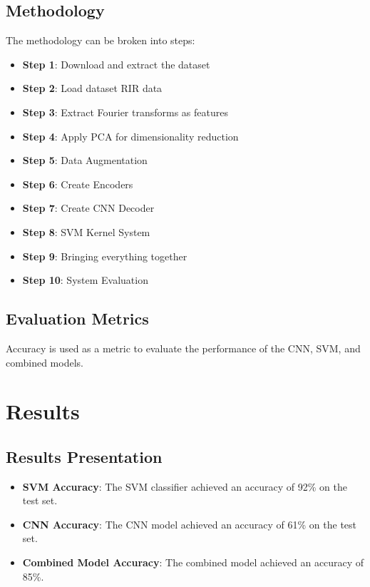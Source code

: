 \documentclass{article}
\begin{document}
\subsection{Methodology}
The methodology can be broken into steps:
\begin{itemize}
\item \textbf{Step 1}: Download and extract the dataset
\item \textbf{Step 2}: Load dataset RIR data
\item \textbf{Step 3}: Extract Fourier transforms as features
\item \textbf{Step 4}: Apply PCA for dimensionality reduction
\item \textbf{Step 5}: Data Augmentation
\item \textbf{Step 6}: Create Encoders
\item \textbf{Step 7}: Create CNN Decoder
\item \textbf{Step 8}: SVM Kernel System
\item \textbf{Step 9}: Bringing everything together
\item \textbf{Step 10}: System Evaluation
\end{itemize}

\subsection{Evaluation Metrics}
Accuracy is used as a metric to evaluate the performance of the CNN, SVM, and combined models.

\section{Results}
\subsection{Results Presentation}
\begin{itemize}
  \item \textbf{SVM Accuracy}: The SVM classifier achieved an accuracy of 92\% on the test set.
  \item \textbf{CNN Accuracy}: The CNN model achieved an accuracy of 61\% on the test set.
  \item \textbf{Combined Model Accuracy}: The combined model achieved an accuracy of 85\%.
\end{itemize}
\end{document}
